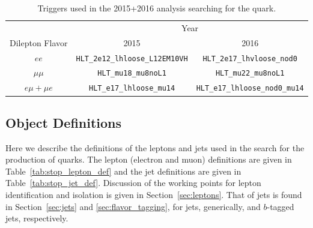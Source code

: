 {\color{red}{Describe the anatomy of a trigger semantics in the common ana chapter}}

\begin{table}[!htb]
    \begin{center}
        \begin{tabular}{c | c | c}
            \hline
            \hline
              & \multicolumn{2}{c}{Year} \\
            Dilepton Flavor & 2015 & 2016 \\
            \hline
            $ee$  & \texttt{HLT\_2e12\_lhloose\_L12EM10VH} & \texttt{HLT\_2e17\_lhvloose\_nod0} \\
            $\mu \mu$ & \texttt{HLT\_mu18\_mu8noL1} & \texttt{HLT\_mu22\_mu8noL1} \\
            $e\mu + \mu e$ & \texttt{HLT\_e17\_lhloose\_mu14} & \texttt{HLT\_e17\_lhloose\_nod0\_mu14} \\
            \hline
            \hline
        \end{tabular}
        \caption{
            Triggers used in the 2015+2016 analysis searching for the \stopone quark.
        }
        \label{tab:stop_triggers}
    \end{center}
\end{table}

%
%

\subsection{Object Definitions}
\label{sec:stop_object_def}

Here we describe the definitions of the leptons and jets used in the search for the
production of \stopone quarks.
The lepton (electron and muon) definitions are given in Table~\ref{tab:stop_lepton_def}
and the jet definitions are given in Table~\ref{tab:stop_jet_def}.
Discussion of the working points for lepton identification and isolation is given in
Section~\ref{sec:leptons}.
That of jets is found in Section~\ref{sec:jets} and \ref{sec:flavor_tagging}, for
jets, generically, and $b$-tagged jets, respectively.


